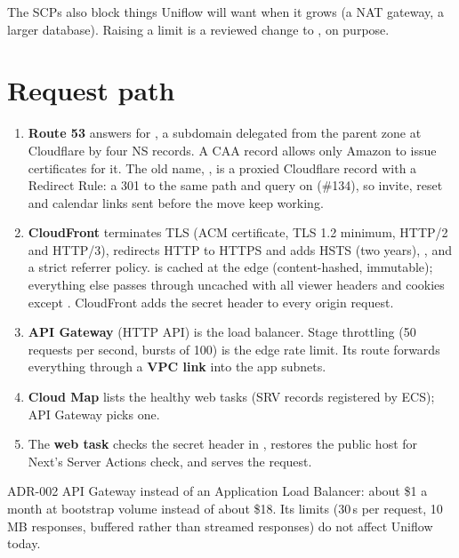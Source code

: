 \begin{risk}
  The SCPs also block things Uniflow will want when it grows (a NAT gateway, a larger database).
  Raising a limit is a reviewed change to , on purpose.
\end{risk}

\section{Request path}\label{sec:aws-request-path}
\begin{enumerate}
  \item \textbf{Route 53} answers for , a subdomain delegated from
    the parent zone at Cloudflare by four NS records. A CAA record allows only Amazon to issue
    certificates for it. The old name, , is a proxied Cloudflare
    record with a Redirect Rule: a 301 to the same path and query on  (\#134), so
    invite, reset and calendar links sent before the move keep working.
  \item \textbf{CloudFront} terminates TLS (ACM certificate, TLS 1.2 minimum, HTTP/2 and HTTP/3),
    redirects HTTP to HTTPS and adds HSTS (two years), , 
    and a strict referrer policy.  is cached at the edge (content-hashed,
    immutable); everything else passes through uncached with all viewer headers and cookies except
    . CloudFront adds the secret header  to every origin request.
  \item \textbf{API Gateway} (HTTP API) is the load balancer. Stage throttling (50 requests per
    second, bursts of 100) is the edge rate limit. Its  route forwards everything
    through a \textbf{VPC link} into the app subnets.
  \item \textbf{Cloud Map} lists the healthy web tasks (SRV records registered by ECS); API Gateway
    picks one.
  \item The \textbf{web task} checks the secret header in , restores the public
    host for Next's Server Actions check, and serves the request.
\end{enumerate}

\begin{decision}{ADR-002}
  API Gateway instead of an Application Load Balancer: about \$1 a month at bootstrap volume
  instead of about \$18. Its limits (30\,s per request, 10\,MB responses, buffered rather than
  streamed responses) do not affect Uniflow today.
\end{decision}

